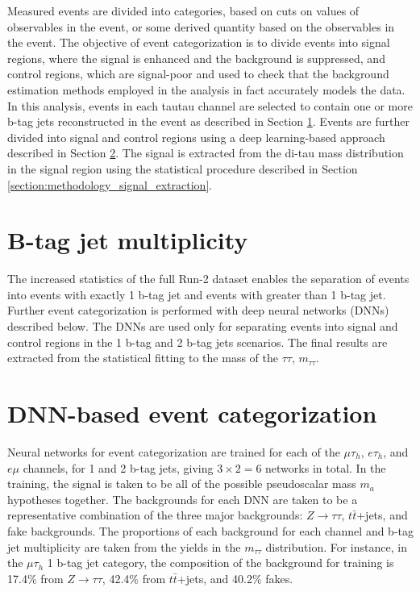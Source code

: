 Measured events are divided into categories, based on cuts on values of observables in the event, or some derived quantity based on the observables in the event. The objective of event categorization is to divide events into signal regions, where the signal is enhanced and the background is suppressed, and control regions, which are signal-poor and used to check that the background estimation methods employed in the analysis in fact accurately models the data. In this analysis, events in each tautau channel are selected to contain one or more b-tag jets reconstructed in the event as described in Section \ref{section:event-categorization-b-tag-jet}. Events are further divided into signal and control regions using a deep learning-based approach described in Section \ref{section:DNN-event-categorization}. The signal is extracted from the di-tau mass distribution in the signal region using the statistical procedure described in Section \ref{section:methodology_signal_extraction}.

\section{B-tag jet multiplicity}
\label{section:event-categorization-b-tag-jet}
The increased statistics of the full Run-2 dataset enables the separation of events into events with exactly 1 b-tag jet and events with greater than 1 b-tag jet. Further event categorization is performed with deep neural networks (DNNs) described below. The DNNs  are used only for separating events into signal and control regions in the 1 b-tag and 2 b-tag jets scenarios. The final results are extracted from the statistical fitting to the mass of the $\tau\tau$, $m_{\tau\tau}$.

\section{DNN-based event categorization}
\label{section:DNN-event-categorization}
Neural networks for event categorization are trained for each of the $\mu\tau_{h}$, $e\tau_{h}$, and $e\mu$ channels, for 1 and 2 b-tag jets, giving $3 \times 2 = 6$ networks in total. In the training, the signal is taken to be all of the possible pseudoscalar mass $m_{a}$ hypotheses together. The backgrounds for each DNN are taken to be a representative combination of the three major backgrounds: $Z \rightarrow \tau\tau$, $t\bar{t}$+jets, and fake backgrounds. The proportions of each background for each channel and b-tag jet multiplicity are taken from the yields in the $m_{\tau\tau}$ distribution. For instance, in the $\mu\tau_{h}$ 1 b-tag jet category, the composition of the background for training is 17.4\% from $Z \rightarrow \tau\tau$, 42.4\% from $t\bar{t}$+jets, and 40.2\% fakes.

